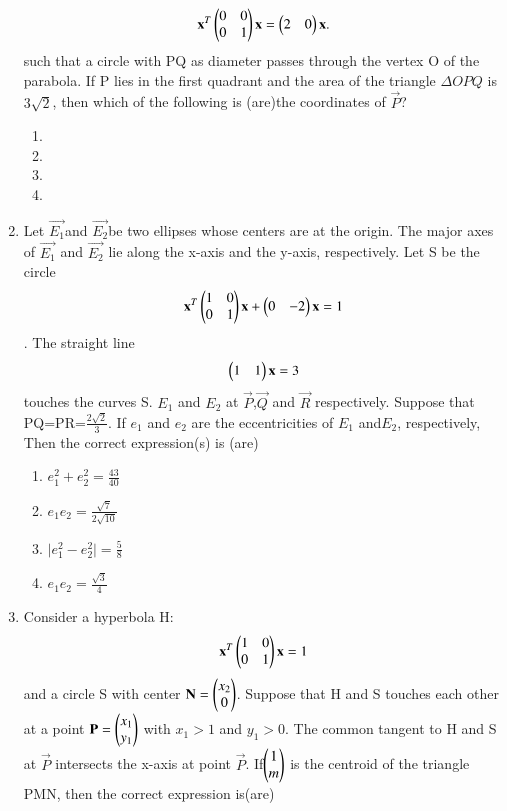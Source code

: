 \documentclass[journal,12pt,twocolumn]{IEEEtran}
\begin{document}
\begin{enumerate}[label=\arabic*]
    \begin{align}
    \mathbf{x}^T \begin{pmatrix}0& 0 \\0 & 1\end{pmatrix}\mathbf{x}=\begin{pmatrix}2&0\end{pmatrix}\mathbf{x}.
    \end{align} such that a circle with PQ as diameter passes through the vertex O of the parabola. 		If P lies in the first quadrant and the area of the triangle $\Delta OPQ$ is $3\sqrt{2}$, then 			which of the following is (are)the coordinates of $\vec{P}$?
    \begin{enumerate}
    \item {}
    \item {}
    \item {}
    \item {}
    \end{enumerate}
    \item Let $\vec{E_1}$and $\vec{E_2}$be two ellipses whose centers are at the origin. 					The major axes of $\vec{E_1} $ and $\vec{E_2}$ lie along the x-axis and the 
    y-axis, respectively. Let S be the circle 
    \begin{align}
    \mathbf{x}^T \begin{pmatrix}1& 0 \\0 & 1\end{pmatrix} \mathbf{x}+\begin{pmatrix}0&-2\end{pmatrix}\mathbf{x}=1
    \end{align}.
    The straight line
    \begin{align}
    \begin{pmatrix}1&1\end{pmatrix}\mathbf{x}=3
    \end{align} touches the curves S. $E_1$ and $E_2$ at $\vec{P}$,$\vec{Q}$ and $\vec{R}$ respectively. Suppose that PQ=PR=$\frac{2\sqrt{2}}{3}$. If $e_1$ and $e_2$ are the eccentricities of $E_1$ and$E_2$, respectively, Then the correct expression(s) is (are)
    \begin{enumerate}
    \item $e_1^2+e_2^2=\frac{43}{40}$
    \item $e_1e_2=\frac{\sqrt{7}}{2\sqrt{10}}$
    \item $\mid e_1^2-e_2^2\mid=\frac{5}{8}$
    \item $e_1e_2=\frac{\sqrt{3}}{4}$
    \end{enumerate}
    \item Consider a hyperbola H:
    \begin{align}
    \mathbf{x}^T \begin{pmatrix}1& 0 \\0 & 1\end{pmatrix} \mathbf{x}=1
    \end{align} and a circle S with center $\mathbf{N}=\begin{pmatrix}x_2\\0\end{pmatrix}$. Suppose that H and S touches each other at a point $\mathbf{P}=\begin{pmatrix}x_1\\y_1\end{pmatrix}$ with $x_1>1 $ and $ y_1>0$. The common tangent to   H and S at $\vec{P}$ intersects the x-axis at point $\vec{P}$. If$\begin{pmatrix}1\\m\end{pmatrix}$ is the centroid of the triangle PMN, then the correct expression is(are)

\end{enumerate}
\end{document}
